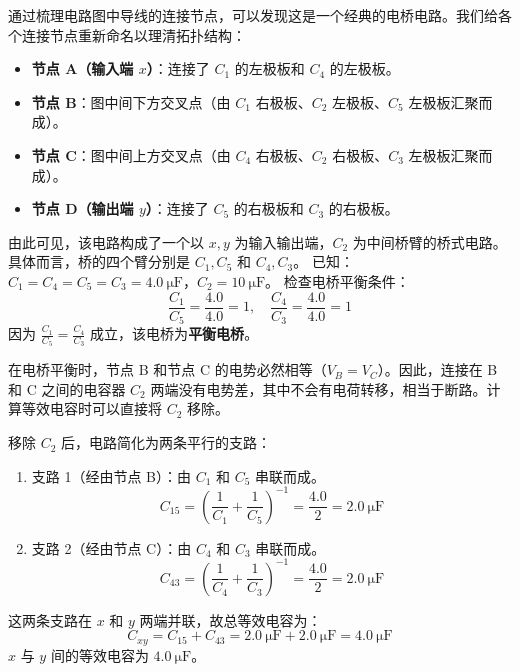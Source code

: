 \begin{solution}
通过梳理电路图中导线的连接节点，可以发现这是一个经典的电桥电路。我们给各个连接节点重新命名以理清拓扑结构：
\begin{itemize}
    \item \textbf{节点 A（输入端 $x$）}：连接了 $C_1$ 的左极板和 $C_4$ 的左极板。
    \item \textbf{节点 B}：图中间下方交叉点（由 $C_1$ 右极板、$C_2$ 左极板、$C_5$ 左极板汇聚而成）。
    \item \textbf{节点 C}：图中间上方交叉点（由 $C_4$ 右极板、$C_2$ 右极板、$C_3$ 左极板汇聚而成）。
    \item \textbf{节点 D（输出端 $y$）}：连接了 $C_5$ 的右极板和 $C_3$ 的右极板。
\end{itemize}

由此可见，该电路构成了一个以 $x, y$ 为输入输出端，$C_2$ 为中间桥臂的桥式电路。具体而言，桥的四个臂分别是 $C_1, C_5$ 和 $C_4, C_3$。
已知：$C_1 = C_4 = C_5 = C_3 = 4.0 \ \mathrm{\mu F}$，$C_2 = 10 \ \mathrm{\mu F}$。
检查电桥平衡条件：
$$ \frac{C_1}{C_5} = \frac{4.0}{4.0} = 1, \quad \frac{C_4}{C_3} = \frac{4.0}{4.0} = 1 $$
因为 $\frac{C_1}{C_5} = \frac{C_4}{C_3}$ 成立，该电桥为\textbf{平衡电桥}。

在电桥平衡时，节点 B 和节点 C 的电势必然相等（$V_B = V_C$）。因此，连接在 B 和 C 之间的电容器 $C_2$ 两端没有电势差，其中不会有电荷转移，相当于断路。计算等效电容时可以直接将 $C_2$ 移除。

移除 $C_2$ 后，电路简化为两条平行的支路：
\begin{enumerate}
    \item 支路 1（经由节点 B）：由 $C_1$ 和 $C_5$ 串联而成。
    $$ C_{15} = \left( \frac{1}{C_1} + \frac{1}{C_5} \right)^{-1} = \frac{4.0}{2} = 2.0 \ \mathrm{\mu F} $$
    \item 支路 2（经由节点 C）：由 $C_4$ 和 $C_3$ 串联而成。
    $$ C_{43} = \left( \frac{1}{C_4} + \frac{1}{C_3} \right)^{-1} = \frac{4.0}{2} = 2.0 \ \mathrm{\mu F} $$
\end{enumerate}

这两条支路在 $x$ 和 $y$ 两端并联，故总等效电容为：
$$ C_{xy} = C_{15} + C_{43} = 2.0 \ \mathrm{\mu F} + 2.0 \ \mathrm{\mu F} = 4.0 \ \mathrm{\mu F} $$
$x$ 与 $y$ 间的等效电容为 $4.0 \ \mathrm{\mu F}$。
\end{solution}

